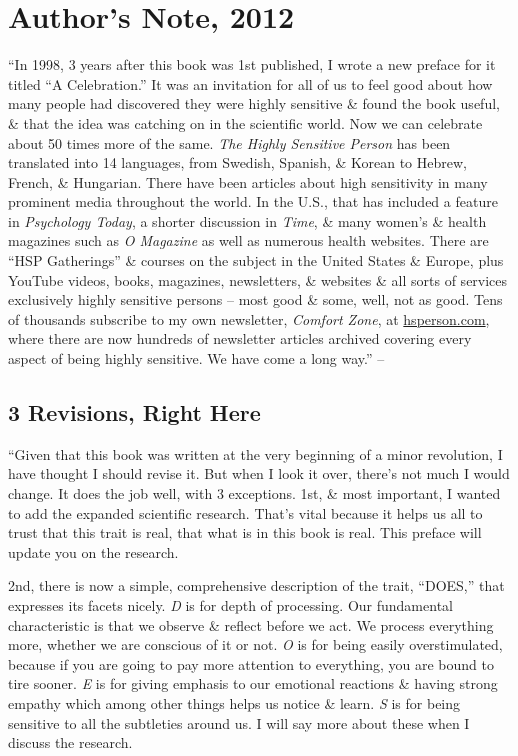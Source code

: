 \documentclass{article}
\numberwithin{equation}{section}
\begin{document}
\section*{Author's Note, 2012}
``In 1998, 3 years after this book was 1st published, I wrote a new preface for it titled ``A Celebration.'' It was an invitation for all of us to feel good about how many people had discovered they were highly sensitive \& found the book useful, \& that the idea was catching on in the scientific world. Now we can celebrate about 50 times more of the same. \textit{The Highly Sensitive Person} has been translated into 14 languages, from Swedish, Spanish, \& Korean to Hebrew, French, \& Hungarian. There have been articles about high sensitivity in many prominent media throughout  the world. In the U.S., that has included a feature in \textit{Psychology Today}, a shorter discussion in \textit{Time}, \& many women's \& health magazines such as \textit{O Magazine} as well as numerous health websites. There are ``HSP Gatherings'' \& courses on the subject in the United States \& Europe, plus YouTube videos, books, magazines, newsletters, \& websites \& all sorts of services exclusively highly sensitive persons -- most good \& some, well, not as good. Tens of thousands subscribe to my own newsletter, \textit{Comfort Zone}, at \url{hsperson.com}, where there are now hundreds of newsletter articles archived covering every aspect of being highly sensitive. We have come a long way.'' -- \cite[p. 10]{Aron2013}

\subsection*{3 Revisions, Right Here}
``Given that this book was written at the very beginning of a minor revolution, I have thought I should revise it. But when I look it over, there's not much I would change. It does the job well, with 3 exceptions. 1st, \& most important, I wanted to add the expanded scientific research. That's vital because it helps us all to trust that this trait is real, that what is in this book is real. This preface will update you on the research.

2nd, there is now a simple, comprehensive description of the trait, ``DOES,'' that expresses its facets nicely. \textit{D} is for depth of processing. Our fundamental characteristic is that we observe \& reflect before we act. We process everything more, whether we are conscious of it or not. \textit{O} is for being easily overstimulated, because if you are going to pay more attention to everything, you are bound to tire sooner. \textit{E} is for giving emphasis to our emotional reactions \& having strong empathy which among other things helps us notice \& learn. \textit{S} is for being sensitive to all the subtleties around us. I will say more about these when I discuss the research.
\end{document}
